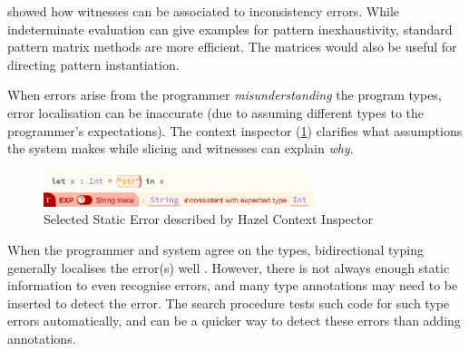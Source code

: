  showed how witnesses can be associated to inconsistency errors. While indeterminate evaluation can give examples for pattern inexhaustivity, standard pattern matrix methods \cite{PatternMatchingWarnings} are more efficient. The matrices would also be useful for directing pattern instantiation.

When errors arise from the programmer \textit{misunderstanding} the program types, error localisation can be inaccurate (due to assuming different types to the programmer's expectations). The context inspector (\cref{fig:ContextInspector}) clarifies what assumptions the system makes while slicing and witnesses can explain \textit{why}.

\begin{figure}[h]\centering
\includegraphics[width=0.7\textwidth]{Media/Figures/context_inspector}
\caption{Selected Static Error described by Hazel Context Inspector}
\label{fig:ContextInspector}
\end{figure}

When the programmer and system agree on the types, bidirectional typing generally localises the error(s) well \cite{BidirectionalTypes, MarkedLocalisation}. However, there is not always enough static information to even recognise errors, and many type annotations may need to be inserted to detect the error. The search procedure tests such code for such type errors automatically, and can be a quicker way to detect these errors than adding annotations. 

